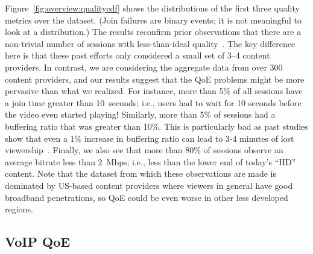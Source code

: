 Figure~\ref{fig:overview:qualitycdf} shows the distributions of the 
first three quality metrics over the dataset.  
(Join failures are binary events; it is not meaningful to look at a 
distribution.) 
The results reconfirm prior observations that there are a non-trivial 
number of sessions with less-than-ideal 
quality~\cite{sigcomm11,sigcomm12}. 
The key difference here is that  these past efforts only considered 
a small set of 3--4 content providers. 
In contrast,   we are considering the aggregate data from over 
300 content providers, and our results suggest that the QoE 
problems might be more pervasive than what we realized.
For instance, more than 5\% of all sessions have a join time greater 
than 10~seconds; i.e., users had to wait for 10 seconds before the 
video even started playing! Similarly, more than 5\% of sessions 
had a buffering ratio that was greater than 10\%.  
This is particularly bad as past studies show that even a 1\% 
increase in buffering ratio can lead to 3-4 minutes of lost 
viewership~\cite{sigcomm11}.  
Finally, we also see that more than 80\% of sessions observe 
an average  bitrate less than 2~Mbps; 
i.e., less than the lower end of today's ``HD'' content.   
Note that the dataset from which these observations are made
is dominated by  US-based content providers where viewers in general
have good broadband penetrations, so QoE could be even worse in 
other less developed regions.





\subsection{VoIP QoE}
\label{subsec:related:voip-qoe}

\newcommand{\Call}{\ensuremath{c}\xspace}
\newcommand{\CallSet}{\ensuremath{C}\xspace}
\newcommand{\Relay}{\ensuremath{r}\xspace}
\newcommand{\RelaySet}{\ensuremath{R}\xspace}
\newcommand{\QualityFunc}{\ensuremath{Q}\xspace}
\newcommand{\HistoryCallSet}{\ensuremath{H}\xspace}
\newcommand{\Assign}{{\sf\small Assign}\xspace}
\newcommand{\Budget}{\ensuremath{B}\xspace}
\newcommand{\Predictor}{{\sf\small Pred}\xspace}
\newcommand{\BuildPredictor}{{\sf\small BuildPredictor}\xspace}
\newcommand{\GetTopK}{{\sf\small GetTopK}\xspace}
\newcommand{\Explore}{{\sf\small Explore}\xspace}
\newcommand{\Src}{\ensuremath{s}\xspace}
\newcommand{\Dst}{\ensuremath{d}\xspace}

